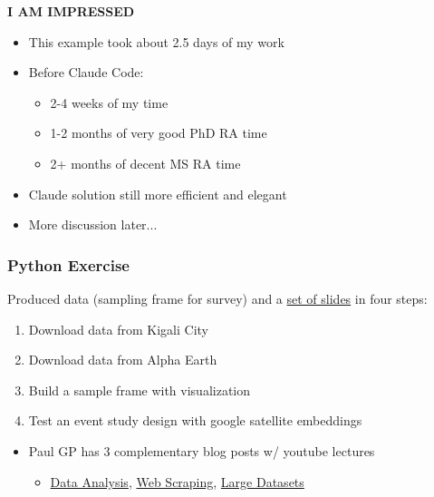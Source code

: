 \documentclass[aspectratio=169, 12pt]{beamer}
\newcommand{\ghLtwo}{https://tannerregan.github.io/GWU_AI_study_group/code/lecture_2/}
\begin{document}
\begin{frame}
    \begin{center}
        \color{red}\bf I AM IMPRESSED
    \end{center}
    \pause
    \begin{itemize}
        \item This example took about 2.5 days of my work
        \item Before Claude Code:  
        \begin{itemize}
            \item 2-4 weeks of my time
            \item 1-2 months of very good PhD RA time
            \item 2+ months of decent MS RA time
        \end{itemize}
        \item Claude solution still more efficient and elegant
        \item More discussion later...
    \end{itemize}
\end{frame}


\begin{frame}
\frametitle{Python Exercise}

Produced data (sampling frame for survey) and a \href{\ghLtwo/python_demo/4_slides_event_study.pdf}{set of slides} in four steps:
\begin{enumerate}
    \item Download data from Kigali City
    \item Download data from Alpha Earth
    \item Build a sample frame with visualization
    \item Test an event study design with google satellite embeddings
\end{enumerate}
\vfill\pause
\begin{itemize}
    \item Paul GP has 3 complementary blog posts w/ youtube lectures
    \begin{itemize}
        \item \href{https://paulgp.substack.com/p/from-an-empty-folder-to-a-figure}{Data Analysis}, \href{https://paulgp.substack.com/p/from-edgar-filings-to-a-structured}{Web Scraping}, \href{https://paulgp.substack.com/p/large-datasets-and-structured-databases}{Large Datasets}
    \end{itemize}
\end{itemize}
\end{frame}
\end{document}
